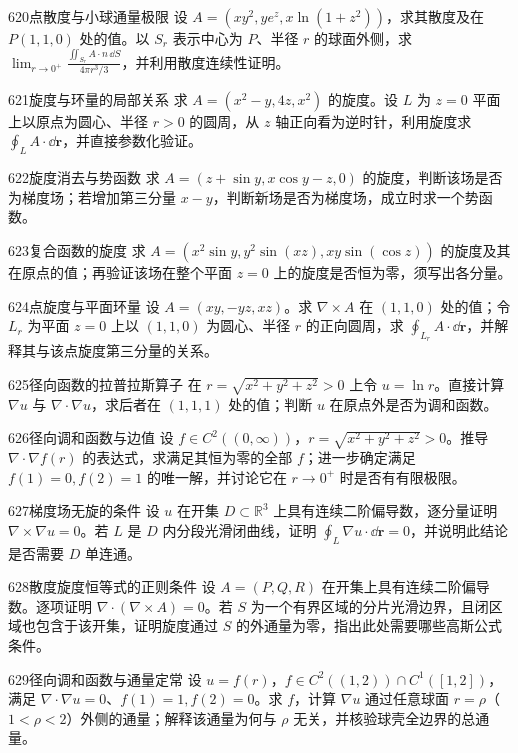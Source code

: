 \begin{exercise}{620}{点散度与小球通量极限}
设 $A=(xy^2,ye^z,x\ln(1+z^2))$，求其散度及在 $P(1,1,0)$ 处的值。以 $S_r$ 表示中心为 $P$、半径 $r$ 的球面外侧，求 $\lim_{r\to0^+}\frac{\iint_{S_r}A\cdot n\,\dd S}{4\pi r^3/3}$，并利用散度连续性证明。
\end{exercise}
\begin{exercise}{621}{旋度与环量的局部关系}
求 $A=(x^2-y,4z,x^2)$ 的旋度。设 $L$ 为 $z=0$ 平面上以原点为圆心、半径 $r>0$ 的圆周，从 $z$ 轴正向看为逆时针，利用旋度求 $\oint_L A\cdot\dd\boldsymbol r$，并直接参数化验证。
\end{exercise}
\begin{exercise}{622}{旋度消去与势函数}
求 $A=(z+\sin y,x\cos y-z,0)$ 的旋度，判断该场是否为梯度场；若增加第三分量 $x-y$，判断新场是否为梯度场，成立时求一个势函数。
\end{exercise}
\begin{exercise}{623}{复合函数的旋度}
求 $A=(x^2\sin y,y^2\sin(xz),xy\sin(\cos z))$ 的旋度及其在原点的值；再验证该场在整个平面 $z=0$ 上的旋度是否恒为零，须写出各分量。
\end{exercise}
\begin{exercise}{624}{点旋度与平面环量}
设 $A=(xy,-yz,xz)$。求 $\nabla\times A$ 在 $(1,1,0)$ 处的值；令 $L_r$ 为平面 $z=0$ 上以 $(1,1,0)$ 为圆心、半径 $r$ 的正向圆周，求 $\oint_{L_r}A\cdot\dd\boldsymbol r$，并解释其与该点旋度第三分量的关系。
\end{exercise}
\begin{exercise}{625}{径向函数的拉普拉斯算子}
在 $r=\sqrt{x^2+y^2+z^2}>0$ 上令 $u=\ln r$。直接计算 $\nabla u$ 与 $\nabla\cdot\nabla u$，求后者在 $(1,1,1)$ 处的值；判断 $u$ 在原点外是否为调和函数。
\end{exercise}
\begin{exercise}{626}{径向调和函数与边值}
设 $f\in C^2((0,\infty))$，$r=\sqrt{x^2+y^2+z^2}>0$。推导 $\nabla\cdot\nabla f(r)$ 的表达式，求满足其恒为零的全部 $f$；进一步确定满足 $f(1)=0,f(2)=1$ 的唯一解，并讨论它在 $r\to0^+$ 时是否有有限极限。
\end{exercise}
\begin{exercise}{627}{梯度场无旋的条件}
设 $u$ 在开集 $D\subset\mathbb R^3$ 上具有连续二阶偏导数，逐分量证明 $\nabla\times\nabla u=0$。若 $L$ 是 $D$ 内分段光滑闭曲线，证明 $\oint_L\nabla u\cdot\dd\boldsymbol r=0$，并说明此结论是否需要 $D$ 单连通。
\end{exercise}
\begin{exercise}{628}{散度旋度恒等式的正则条件}
设 $A=(P,Q,R)$ 在开集上具有连续二阶偏导数。逐项证明 $\nabla\cdot(\nabla\times A)=0$。若 $S$ 为一个有界区域的分片光滑边界，且闭区域也包含于该开集，证明旋度通过 $S$ 的外通量为零，指出此处需要哪些高斯公式条件。
\end{exercise}
\begin{exercise}{629}{径向调和函数与通量定常}
设 $u=f(r)$，$f\in C^2((1,2))\cap C^1([1,2])$，满足 $\nabla\cdot\nabla u=0$、$f(1)=1,f(2)=0$。求 $f$，计算 $\nabla u$ 通过任意球面 $r=\rho$（$1<\rho<2$）外侧的通量；解释该通量为何与 $\rho$ 无关，并核验球壳全边界的总通量。
\end{exercise}
